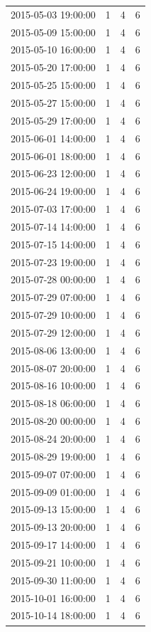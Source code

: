 \begin{tabular}{lrrr}
2015-05-03 19:00:00 & 1 & 4 & 6 \\
2015-05-09 15:00:00 & 1 & 4 & 6 \\
2015-05-10 16:00:00 & 1 & 4 & 6 \\
2015-05-20 17:00:00 & 1 & 4 & 6 \\
2015-05-25 15:00:00 & 1 & 4 & 6 \\
2015-05-27 15:00:00 & 1 & 4 & 6 \\
2015-05-29 17:00:00 & 1 & 4 & 6 \\
2015-06-01 14:00:00 & 1 & 4 & 6 \\
2015-06-01 18:00:00 & 1 & 4 & 6 \\
2015-06-23 12:00:00 & 1 & 4 & 6 \\
2015-06-24 19:00:00 & 1 & 4 & 6 \\
2015-07-03 17:00:00 & 1 & 4 & 6 \\
2015-07-14 14:00:00 & 1 & 4 & 6 \\
2015-07-15 14:00:00 & 1 & 4 & 6 \\
2015-07-23 19:00:00 & 1 & 4 & 6 \\
2015-07-28 00:00:00 & 1 & 4 & 6 \\
2015-07-29 07:00:00 & 1 & 4 & 6 \\
2015-07-29 10:00:00 & 1 & 4 & 6 \\
2015-07-29 12:00:00 & 1 & 4 & 6 \\
2015-08-06 13:00:00 & 1 & 4 & 6 \\
2015-08-07 20:00:00 & 1 & 4 & 6 \\
2015-08-16 10:00:00 & 1 & 4 & 6 \\
2015-08-18 06:00:00 & 1 & 4 & 6 \\
2015-08-20 00:00:00 & 1 & 4 & 6 \\
2015-08-24 20:00:00 & 1 & 4 & 6 \\
2015-08-29 19:00:00 & 1 & 4 & 6 \\
2015-09-07 07:00:00 & 1 & 4 & 6 \\
2015-09-09 01:00:00 & 1 & 4 & 6 \\
2015-09-13 15:00:00 & 1 & 4 & 6 \\
2015-09-13 20:00:00 & 1 & 4 & 6 \\
2015-09-17 14:00:00 & 1 & 4 & 6 \\
2015-09-21 10:00:00 & 1 & 4 & 6 \\
2015-09-30 11:00:00 & 1 & 4 & 6 \\
2015-10-01 16:00:00 & 1 & 4 & 6 \\
2015-10-14 18:00:00 & 1 & 4 & 6 \\

\end{tabular}
